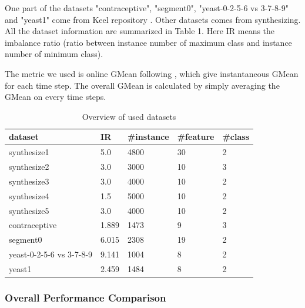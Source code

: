 \documentclass{article}
\begin{document}
One part of the datasets "contraceptive", "segment0", "yeast-0-2-5-6 vs 3-7-8-9" and "yeast1" come from Keel repository .
Other datasets comes from synthesizing. All the dataset information are summarized in Table 1. Here IR means the imbalance ratio (ratio between instance number of maximum class and instance number of minimum class).

The metric we used is online GMean following , which give instantaneous GMean for each time step. The overall GMean is calculated by simply averaging the GMean on every time steps.

\begin{table}[!ht]
	\centering
	\begin{tabular}{|l||l|l|l|l|}
		\hline
		dataset & IR & \#instance & \#feature & \#class \\ \hline\hline
		synthesize1 & 5.0 & 4800 & 30 & 2 \\ \hline
		synthesize2 & 3.0 & 3000 & 10 & 3 \\ \hline
		synthesize3 & 3.0 & 4000 & 10 & 2 \\ \hline
		synthesize4 & 1.5 & 5000 & 10 & 2 \\ \hline
		synthesize5 & 3.0 & 4000 & 10 & 2 \\ \hline
		contraceptive & 1.889 & 1473 & 9 & 3 \\ \hline
		segment0 & 6.015 & 2308 & 19 & 2 \\ \hline
		yeast-0-2-5-6 vs 3-7-8-9 & 9.141 & 1004 & 8 & 2 \\ \hline
		yeast1 & 2.459 & 1484 & 8 & 2 \\ \hline
	\end{tabular}
	\label{tab:overview}
	\caption{Overview of used datasets}
\end{table}



\subsubsection{Overall Performance Comparison}
\end{document}

